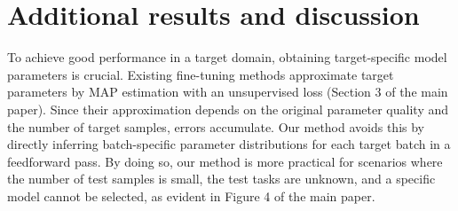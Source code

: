\begin{table}[ht!]
\centering

\caption{{\textbf{Computational time comparison on different datasets with ResNet-18 as a backbone network during test-time generalization.}} 
The proposed method has better overall time consumption than existing test-time adaptation and test-time domain generalization methods.
}
\label{table:runtime_ttdg}
\end{table}



\section{Additional results and discussion}
\label{section:additional_results}

{To achieve good performance in a target domain, obtaining target-specific model parameters is crucial. Existing fine-tuning methods approximate target parameters by MAP estimation with an unsupervised loss (Section 3 of the main paper). Since their approximation depends on the original parameter quality and the number of target samples, errors accumulate. Our method avoids this by directly inferring batch-specific parameter distributions for each target batch in a feedforward pass. By doing so, our method is more practical for scenarios where the number of test samples is small, the test tasks are unknown, and a specific model cannot be selected, as evident in Figure 4 of the main paper. } \\


